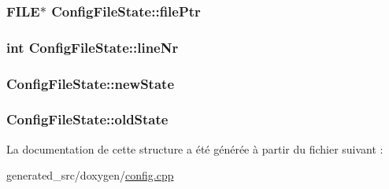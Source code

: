 \subsubsection[{file\+Ptr}]{\setlength{\rightskip}{0pt plus 5cm}F\+I\+L\+E$\ast$ Config\+File\+State\+::file\+Ptr}\label{struct_config_file_state_aa5d616a4c7712d0d7be52d4a56254672}
\hypertarget{struct_config_file_state_a41d216c2114d71fa486a48f063a88d16}{}
\subsubsection[{line\+Nr}]{\setlength{\rightskip}{0pt plus 5cm}int Config\+File\+State\+::line\+Nr}\label{struct_config_file_state_a41d216c2114d71fa486a48f063a88d16}
\hypertarget{struct_config_file_state_a219e8266c897bd4c52c76e0adc04a900}{}
\subsubsection[{new\+State}]{ Config\+File\+State\+::new\+State}\label{struct_config_file_state_a219e8266c897bd4c52c76e0adc04a900}
\hypertarget{struct_config_file_state_aaacb1254715397e72db10477de158e2c}{}
\subsubsection[{old\+State}]{ Config\+File\+State\+::old\+State}\label{struct_config_file_state_aaacb1254715397e72db10477de158e2c}


La documentation de cette structure a été générée à partir du fichier suivant \+:\begin{DoxyCompactItemize}
\item 
generated\+\_\+src/doxygen/\hyperlink{config_8cpp}{config.\+cpp}\end{DoxyCompactItemize}
